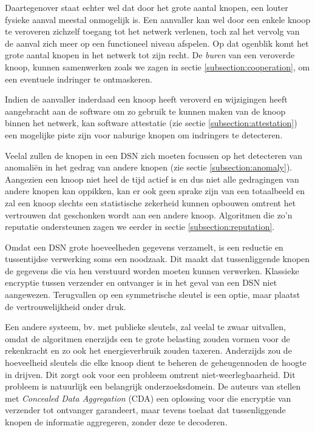 Daartegenover staat echter wel dat door het grote aantal knopen, een louter
fysieke aanval meestal onmogelijk is. Een aanvaller kan wel door een enkele
knoop te veroveren zichzelf toegang tot het netwerk verlenen, toch zal het
vervolg van de aanval zich meer op een functioneel niveau afspelen. Op dat
ogenblik komt het grote aantal knopen in het netwerk tot zijn recht. De
\emph{buren} van een veroverde knoop, kunnen samenwerken zoals we zagen in
sectie \ref{subsection:cooperation}, om een eventuele indringer te ontmaskeren.

Indien de aanvaller inderdaad een knoop heeft veroverd en wijzigingen heeft
aangebracht aan de software om zo gebruik te kunnen maken van de knoop binnen
het netwerk, kan software attestatie (zie sectie \ref{subsection:attestation})
een mogelijke piste zijn voor naburige knopen om indringers te detecteren.

Veelal zullen de knopen in een DSN zich moeten focussen op het detecteren van
anomali\"en in het gedrag van andere knopen (zie sectie
\ref{subsection:anomaly}). Aangezien een knoop niet heel de tijd actief is en
dus niet alle gedragingen van andere knopen kan oppikken, kan er ook geen
sprake zijn van een totaalbeeld en zal een knoop slechts een statistische
zekerheid kunnen opbouwen omtrent het vertrouwen dat geschonken wordt aan een
andere knoop. Algoritmen die zo'n reputatie ondersteunen zagen we eerder in
sectie \ref{subsection:reputation}.

Omdat een DSN grote hoeveelheden gegevens verzamelt, is een reductie en
tussentijdse verwerking soms een noodzaak. Dit maakt dat tussenliggende knopen
de gegevens die via hen verstuurd worden moeten kunnen verwerken. Klassieke
encryptie tussen verzender en ontvanger is in het geval van een DSN niet
aangewezen. Terugvallen op een symmetrische sleutel is een optie, maar plaatst
de vertrouwelijkheid onder druk.

Een andere systeem, bv. met publieke sleutels, zal veelal te zwaar uitvallen,
omdat de algoritmen enerzijds een te grote belasting zouden vormen voor de
rekenkracht en zo ook het energieverbruik zouden taxeren. Anderzijds zou de
hoeveelheid sleutels die elke knoop dient te beheren de geheugennoden de hoogte
in drijven. Dit zorgt ook voor een probleem omtrent niet-weerlegbaarheid. Dit
probleem is natuurlijk een belangrijk onderzoeksdomein. De auteurs van
\citep{girao2005cda} stellen met \emph{Concealed Data Aggregation} (CDA) een
oplossing voor die encryptie van verzender tot ontvanger garandeert, maar
tevens toelaat dat tussenliggende knopen de informatie aggregeren, zonder deze
te decoderen.

